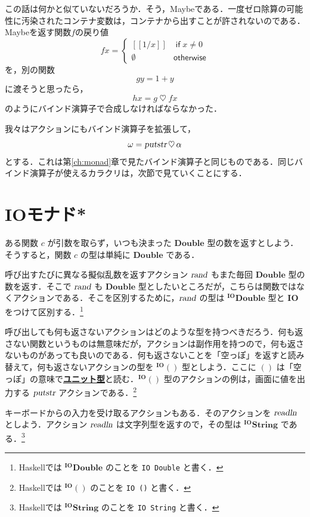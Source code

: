 \documentclass[a4paper,twocolumn]{jsbook}
\def\[{\left[\!\left[}
\def\]{\right]\!\right]}
\newcommand{\programminglanguage}[1]{\textsf{#1}}
\newcommand{\haskell}{\programminglanguage{Haskell}}
\newcommand{\keyword}[1]{{\underline{\textbf{#1}}}}
\newcommand{\code}[1]{\texttt{#1}}
\newcommand{\mKeyword}[1]{\mathsf{#1}} %
\newcommand{\mIfKeyword}{\mKeyword{if}}
\newcommand{\mOtherwiseKeyword}{\mKeyword{otherwise}}
\DeclareMathOperator{\mIf}{\mIfKeyword}
\DeclareMathOperator{\mOtherwise}{\mOtherwiseKeyword}
\newcommand{\mNothing}{\emptyset}
\newcommand{\mAction}[1]{\textsl{#1}}
\DeclareMathOperator{\mReadLn}{\mAction{readln}}
\DeclareMathOperator{\mPutStr}{\mAction{putstr}}
\DeclareMathOperator{\mRand}{\mAction{rand}}
\DeclareMathOperator{\mBind}{\heartsuit}
\newcommand{\mType}[1]{\mathbf{#1}}
\newcommand{\mMaybeWith}[1]{\[#1\]}
\newcommand{\mDoubleType}{\mType{Double}}
\newcommand{\mIOType}{\mType{IO}}
\newcommand{\mStringType}{\mType{String}}
\newcommand{\mUnitType}{\mType{()}}
\newcommand{\mIODoubleType}{{}^\mIOType\mDoubleType}
\newcommand{\mIOStringType}{{}^\mIOType\mStringType}
\newcommand{\mIOUnitType}{{}^\mIOType\mUnitType}
\begin{document}
この話は何かと似ていないだろうか．そう，Maybeである．一度ゼロ除算の可能性に汚染されたコンテナ変数は，コンテナから出すことが許されないのである．Maybeを返す関数$f$の戻り値
\begin{equation}
fx=\begin{cases}
\mMaybeWith{1/x}&\mIf x\neq0\\
\mNothing&\mOtherwise
\end{cases}
\end{equation}
を，別の関数
\begin{equation}
gy=1+y
\end{equation}
に渡そうと思ったら，
\begin{equation}
hx=g\mBind fx
\end{equation}
のようにバインド演算子で合成しなければならなかった．

我々はアクションにもバインド演算子を拡張して，
\begin{equation}
\omega=\mPutStr\mBind\alpha
\end{equation}
とする．これは第\ref{ch:monad}章で見たバインド演算子と同じものである．同じバインド演算子が使えるカラクリは，次節で見ていくことにする．

\section{IOモナド*}

ある関数 $c$ が引数を取らず，いつも決まった $\mDoubleType$ 型の数を返すとしよう．そうすると，関数 $c$ の型は単純に $\mDoubleType$ である．

呼び出すたびに異なる擬似乱数を返すアクション $\mRand$ もまた毎回 $\mDoubleType$ 型の数を返す．そこで $\mRand$ も $\mDoubleType$ 型としたいところだが，こちらは関数ではなくアクションである．そこを区別するために，$\mRand$ の型は $\mIODoubleType$ 型と $\mIOType$ をつけて区別する．\footnote{\haskell では $\mIODoubleType$ のことを \code{IO Double} と書く．}

呼び出しても何も返さないアクションはどのような型を持つべきだろう．何も返さない関数というものは無意味だが，アクションは副作用を持つので，何も返さないものがあっても良いのである．何も返さないことを「空っぽ」を返すと読み替えて，何も返さないアクションの型を $\mIOUnitType$ 型としよう．ここに $\mUnitType$ は「空っぽ」の意味で\keyword{ユニット型}と読む．$\mIOUnitType$ 型のアクションの例は，画面に値を出力する $\mPutStr$ アクションである．\footnote{\haskell では $\mIOUnitType$ のことを \code{IO ()} と書く．}

キーボードからの入力を受け取るアクションもある．そのアクションを $\mReadLn$ としよう．アクション $\mReadLn$ は文字列型を返すので，その型は $\mIOStringType$ である．\footnote{\haskell では $\mIOStringType$ のことを \code{IO String} と書く．}
\end{document}
